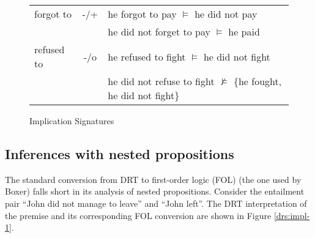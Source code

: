 \begin{figure}
\begin{center}
\begin{tabular}{l c l}
   	forgot to        & -/+ & he forgot to pay $\vDash$ he did not pay \\
   	                 &     & he did not forget to pay $\vDash$ he paid \\
   	\hline
   	refused to       & -/o & he refused to fight $\vDash$ he did not fight \\
   	                 &     & he did not refuse to fight $\nvDash$ \{he fought, he did not fight\} \\
   	\hline
  \end{tabular}
\end{center}
\caption{Implication Signatures}
\label{fig:imp-sig}
\end{figure}

\subsection*{Inferences with nested propositions}

The standard conversion from DRT to first-order logic (FOL) (the one used by
Boxer) falls short in its analysis of nested propositions.  Consider the
entailment pair ``John did not manage to leave'' and ``John left''.  The DRT
interpretation of the premise and its corresponding FOL conversion are 
shown in Figure \ref{drs:impl-1}.

